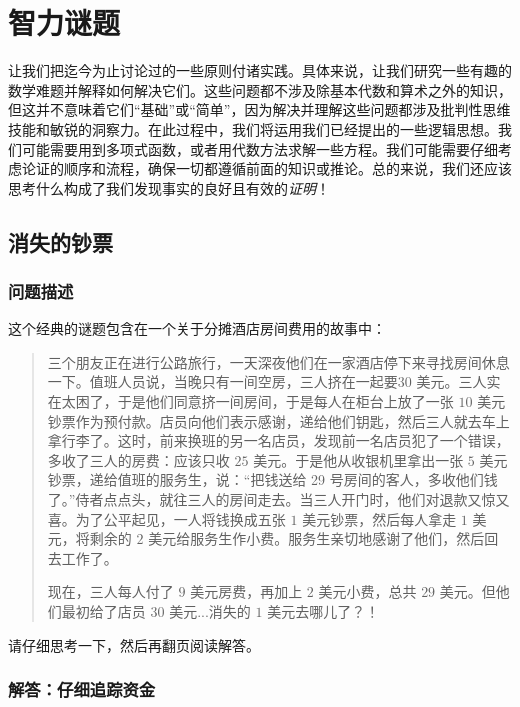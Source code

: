 \section{智力谜题}\label{sec:section1.4}

让我们把迄今为止讨论过的一些原则付诸实践。具体来说，让我们研究一些有趣的数学难题并解释如何解决它们。这些问题都不涉及除基本代数和算术之外的知识，但这并不意味着它们``基础''或``简单''，因为解决并理解这些问题都涉及批判性思维技能和敏锐的洞察力。在此过程中，我们将运用我们已经提出的一些逻辑思想。我们可能需要用到多项式函数，或者用代数方法求解一些方程。我们可能需要仔细考虑论证的顺序和流程，确保一切都遵循前面的知识或推论。总的来说，我们还应该思考什么构成了我们发现事实的良好且有效的\emph{证明}！

\subsection{消失的钞票}

\subsubsection*{问题描述}

这个经典的谜题包含在一个关于分摊酒店房间费用的故事中：

\begin{quote}
    三个朋友正在进行公路旅行，一天深夜他们在一家酒店停下来寻找房间休息一下。值班人员说，当晚只有一间空房，三人挤在一起要$30$ 美元。三人实在太困了，于是他们同意挤一间房间，于是每人在柜台上放了一张 $10$ 美元钞票作为预付款。店员向他们表示感谢，递给他们钥匙，然后三人就去车上拿行李了。这时，前来换班的另一名店员，发现前一名店员犯了一个错误，多收了三人的房费：应该只收 $25$ 美元。于是他从收银机里拿出一张 $5$ 美元钞票，递给值班的服务生，说：``把钱送给 29 号房间的客人，多收他们钱了。''侍者点点头，就往三人的房间走去。当三人开门时，他们对退款又惊又喜。为了公平起见，一人将钱换成五张 $1$ 美元钞票，然后每人拿走 $1$ 美元，将剩余的 $2$ 美元给服务生作小费。服务生亲切地感谢了他们，然后回去工作了。

    现在，三人每人付了 $9$ 美元房费，再加上 $2$ 美元小费，总共 $29$ 美元。但他们最初给了店员 $30$ 美元...消失的 $1$ 美元去哪儿了？！
\end{quote}

请仔细思考一下，然后再翻页阅读解答。

\clearpage

\subsubsection*{解答：仔细追踪资金}

